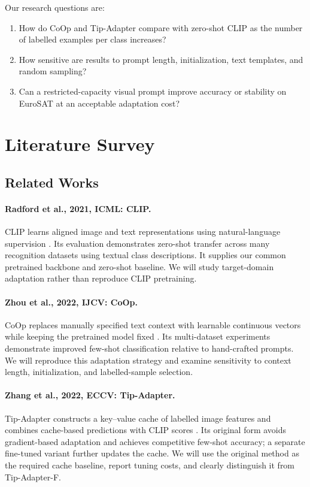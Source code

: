 \documentclass[11pt,letterpaper]{article}
\begin{document}
Our research questions are:
\begin{enumerate}[nosep,leftmargin=*]
  \item How do CoOp and Tip-Adapter compare with zero-shot CLIP as the number of labelled examples per class increases?
  \item How sensitive are results to prompt length, initialization, text templates, and random sampling?
  \item Can a restricted-capacity visual prompt improve accuracy or stability on EuroSAT at an acceptable adaptation cost?
\end{enumerate}

\section{Literature Survey}
\subsection{Related Works}

\paragraph{Radford et al., 2021, ICML: CLIP.}
CLIP learns aligned image and text representations using natural-language supervision \cite{clip}. Its evaluation demonstrates zero-shot transfer across many recognition datasets using textual class descriptions. It supplies our common pretrained backbone and zero-shot baseline. We will study target-domain adaptation rather than reproduce CLIP pretraining.

\paragraph{Zhou et al., 2022, IJCV: CoOp.}
CoOp replaces manually specified text context with learnable continuous vectors while keeping the pretrained model fixed \cite{coop}. Its multi-dataset experiments demonstrate improved few-shot classification relative to hand-crafted prompts. We will reproduce this adaptation strategy and examine sensitivity to context length, initialization, and labelled-sample selection.

\paragraph{Zhang et al., 2022, ECCV: Tip-Adapter.}
Tip-Adapter constructs a key--value cache of labelled image features and combines cache-based predictions with CLIP scores \cite{tip}. Its original form avoids gradient-based adaptation and achieves competitive few-shot accuracy; a separate fine-tuned variant further updates the cache. We will use the original method as the required cache baseline, report tuning costs, and clearly distinguish it from Tip-Adapter-F.
\end{document}
